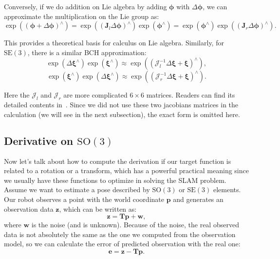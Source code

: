 Conversely, if we do addition on Lie algebra by adding $\boldsymbol{\phi}$ with $\Delta \boldsymbol{\phi}$, we can approximate the multiplication on the Lie group as:
\begin{equation}
\exp \left( {{{\left( { \boldsymbol{\phi} + \Delta \boldsymbol{\phi} } \right)}^ \wedge }} \right) = \exp \left( {{{\left( {{ \mathbf{J}_l}\Delta \boldsymbol{\phi} } \right)}^ \wedge }} \right)\exp \left( {{ \boldsymbol{\phi} ^ \wedge }} \right) = \exp \left( {{\boldsymbol{\phi} ^ \wedge }} \right)\exp \left( {{{\left( {{\mathbf{J}_r}\Delta \boldsymbol{ \phi} } \right)}^ \wedge }} \right).
\end{equation}

This provides a theoretical basis for calculus on Lie algebra. Similarly, for $\mathrm{SE}(3)$, there is a similar BCH approximation:
\begin{equation}
\exp \left( {\Delta {\boldsymbol{\xi} ^ \wedge }} \right)\exp \left( {{ \boldsymbol{\xi} ^ \wedge }} \right) \approx \exp \left ( {{{\left( {{ \boldsymbol{\mathcal{J}}_l^{-1} }\Delta \boldsymbol{\xi} + \boldsymbol{\xi} } \right)}^ \wedge }} \right),
\end{equation}
\begin{equation}
\exp \left( {{ \boldsymbol{\xi} ^ \wedge }} \right) \exp \left( {\Delta {\boldsymbol{\xi} ^ \wedge }} \right) \approx \exp \left ( {{{\left( {{ \boldsymbol{\mathcal{J}}_r^{-1} }\Delta \boldsymbol{\xi} + \boldsymbol{\xi} } \right)}^ \wedge }} \right).
\end{equation}

Here the $\boldsymbol{\mathcal{J}}_l$ and $\boldsymbol{\mathcal{J}}_r$ are more complicated $6 \times 6$ matrices. Readers can find its detailed contents in~\cite{Barfoot2016}. Since we did not use these two jacobians matrices in the calculation (we will see in the next subsection), the exact form is omitted here.

\subsection{Derivative on $\mathrm{SO}(3)$}
Now let's talk about how to compute the derivation if our target function is related to a rotation or a transform, which has a powerful practical meaning since we usually have these functions to optimize in solving the SLAM problem. Assume we want to estimate a pose described by $\mathrm{SO}(3)$ or $\mathrm{SE}(3)$ elements. Our robot observes a point with the world coordinate $\mathbf{p}$ and generates an observation data $\mathbf{z}$, which can be written as:
\begin{equation}
\mathbf{z} = \mathbf{T} \mathbf{p} + \mathbf{w},
\end{equation}
where $\mathbf{w}$ is the noise (and is unknown). Because of the noise, the real observed data is not absolutely the same as the one we computed from the observation model, so we can calculate the error of predicted observation with the real one: 
\begin{equation}
\mathbf{e} = \mathbf{z} - \mathbf{T} \mathbf{p}.
\end{equation}

